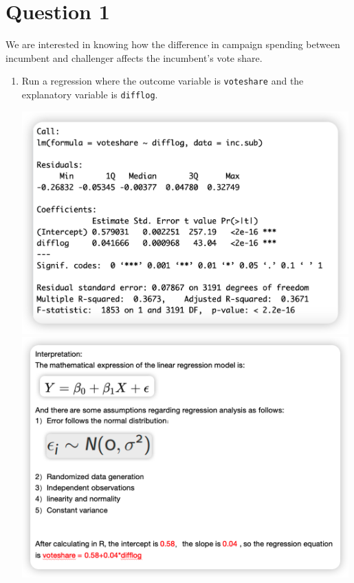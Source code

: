 \documentclass[12pt,letterpaper]{article}
\begin{document}
\section*{Question 1}
\vspace{.25cm}
\noindent We are interested in knowing how the difference in campaign spending between incumbent and challenger affects the incumbent's vote share. 
	\begin{enumerate}
		\item Run a regression where the outcome variable is \texttt{voteshare} and the explanatory variable is \texttt{difflog}.	\vspace{1cm}
        
        \vspace{1cm}
        \includegraphics[width=0.99\textwidth]{1-1.png}
        \vspace{1cm}
        \includegraphics[width=0.99\textwidth]{1-1-inter.png}

\end{enumerate}
\end{document}
